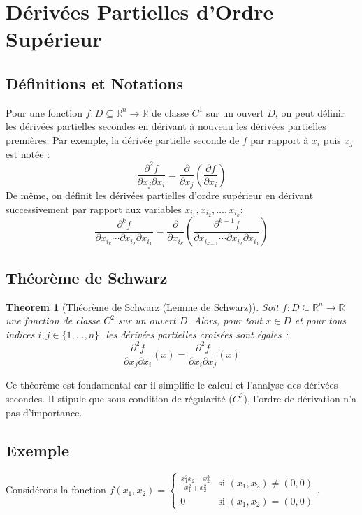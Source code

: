 \documentclass{article}
\newtheorem{theorem}{Theorem}
\begin{document}
\section{Dérivées Partielles d'Ordre Supérieur}

\subsection{Définitions et Notations}

Pour une fonction $f: D \subseteq \mathbb{R}^n \rightarrow \mathbb{R}$ de classe $C^1$ sur un ouvert $D$, on peut définir les dérivées partielles secondes en dérivant à nouveau les dérivées partielles premières.
Par exemple, la dérivée partielle seconde de $f$ par rapport à $x_i$ puis $x_j$ est notée :
\[ \frac{\partial^2 f}{\partial x_j \partial x_i} = \frac{\partial}{\partial x_j} \left( \frac{\partial f}{\partial x_i} \right) \]
De même, on définit les dérivées partielles d'ordre supérieur en dérivant successivement par rapport aux variables $x_{i_1}, x_{i_2}, \ldots, x_{i_k}$:
\[ \frac{\partial^k f}{\partial x_{i_k} \cdots \partial x_{i_2} \partial x_{i_1}} = \frac{\partial}{\partial x_{i_k}} \left( \frac{\partial^{k-1} f}{\partial x_{i_{k-1}} \cdots \partial x_{i_2} \partial x_{i_1}} \right) \]

\subsection{Théorème de Schwarz}

\begin{theorem}[Théorème de Schwarz (Lemme de Schwarz)]
Soit $f: D \subseteq \mathbb{R}^n \rightarrow \mathbb{R}$ une fonction de classe $C^2$ sur un ouvert $D$. Alors, pour tout $x \in D$ et pour tous indices $i, j \in \{1, \ldots, n\}$, les dérivées partielles croisées sont égales :
\[ \frac{\partial^2 f}{\partial x_j \partial x_i}(x) = \frac{\partial^2 f}{\partial x_i \partial x_j}(x) \]
\end{theorem}
Ce théorème est fondamental car il simplifie le calcul et l'analyse des dérivées secondes. Il stipule que sous condition de régularité ($C^2$), l'ordre de dérivation n'a pas d'importance.

\subsection{Exemple}
Considérons la fonction $f(x_1, x_2) = \begin{cases}
    \frac{x_1^2 x_2 - x_2^3}{x_1^2 + x_2^2} & \text{si } (x_1, x_2) \neq (0,0) \\
    0 & \text{si } (x_1, x_2) = (0,0)
\end{cases}$.
\end{document}
